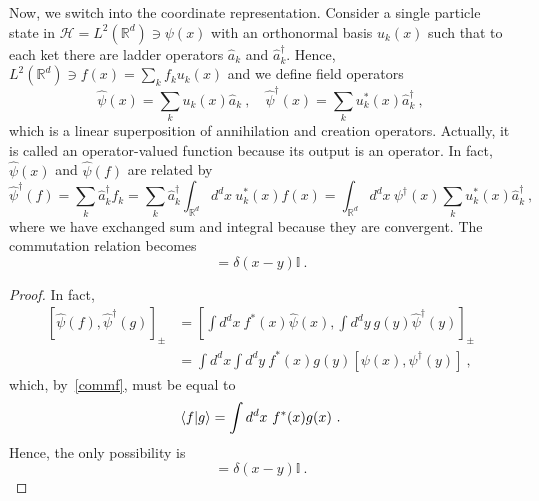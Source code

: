     Now, we switch into the coordinate representation. Consider a single particle state in $\mathcal H = L^2(\mathbb R^d) \ni \psi(x)$ with an orthonormal basis $u_k(x)$ such that to each ket there are ladder operators $\hat a_k$ and $\hat a_k^\dagger$. Hence, $L^2(\mathbb R^d) \ni f(x) = \sum_k f_k u_k(x)$ and we define field operators
    \begin{equation*}
        \hat \psi(x) = \sum_k u_k (x) \hat a_k ~, \quad \hat \psi^\dagger (x) = \sum_k u_k^* (x) \hat a_k^\dagger ~,
    \end{equation*}
    which is a linear superposition of annihilation and creation operators. Actually, it is called an operator-valued function because its output is an operator. In fact, $\hat \psi(x)$ and $\hat \psi (f)$ are related by
    \begin{equation*}
        \hat \psi^\dagger (f) = \sum_k \hat a_k^\dagger f_k = \sum_k \hat a_k^\dagger \int_{\mathbb R^d} d^d x ~ u^*_k(x) f(x) = \int_{\mathbb R^d} d^d x ~ \psi^\dagger (x) \sum_k u_k^* (x) \hat a_k^\dagger ~,
    \end{equation*}
    where we have exchanged sum and integral because they are convergent. 
    The commutation relation becomes
    \begin{equation*}
        [\hat \psi(x), \hat \psi^\dagger (y)] = \delta (x - y)  \mathbb I ~.
    \end{equation*}
    \begin{proof}
        In fact,
        \begin{equation*}
        \begin{aligned}
            [\hat \psi (f), \hat \psi^\dagger (g)]_\pm & = [\int d^d x ~ f^* (x) \hat \psi(x), \int d^d y ~ g(y) \hat \psi^\dagger (y)]_\pm \\ & = \int d^d x \int d^d y ~ f^*(x) g(y) [\psi(x), \psi^\dagger (y)]  ~,
        \end{aligned}
        \end{equation*}
        which, by~\eqref{commf}, must be equal to 
        \begin{equation*}
            \langle f\vert g\rangle = \int d^d x ~ f^* (x) g(x) ~.
        \end{equation*}
        Hence, the only possibility is
        \begin{equation*}
            [\psi(x), \psi^\dagger (y)] = \delta (x - y) \mathbb I ~.
        \end{equation*}
    \end{proof}

